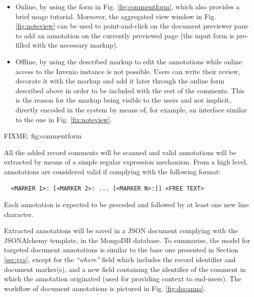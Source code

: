 \begin{itemize}
  \item Online, by using the form in Fig. \ref{fig:commentform}, which also
        provides a brief usage tutorial. Moreover, the aggregated view window in
        Fig. \ref{fig:noteview} can be used to point-and-click on the document
        previewer pane to add an annotation on the currently previewed page (the
        input form is pre-filled with the necessary markup).
  \item Offline, by using the described markup to edit the annotations while
        online access to the Invenio instance is not possible. Users can write
        their review, decorate it with the markup and add it later through the
        online form described above in order to be included with the rest of the
        comments. This is the reason for the markup being visible to the users
        and not implicit, directly encoded in the system by means of, for
        example, an interface similar to the one in Fig. \ref{fix:noteview}.
\end{itemize}

FIXME: fig:commentform

All the added record comments will be scanned and valid annotations will be
extracted by means of a simple regular expression mechanism. From a high level,
annotations are considered valid if complying with the following format:
\begin{verbatim}
  <MARKER 1>: [<MARKER 2>: ... [<MARKER N>:]] <FREE TEXT>
\end{verbatim}
Each annotation is expected to be preceded and followed by at least one new
line character.

Extracted annotations will be saved in a JSON document complying with the
JSONAlchemy template, in the MongoDB database. To summarise, the model for
targeted document annotations is similar to the base one presented in Section
\ref{sec:gra}, except for the \textit{``where''} field which includes the
record identifier and document marker(s), and a new field containing the
identifier of the comment in which the annotation originated (used for
providing context to end-users). The workflow of document annotations is
pictured in Fig. \ref{fig:docanno}.

